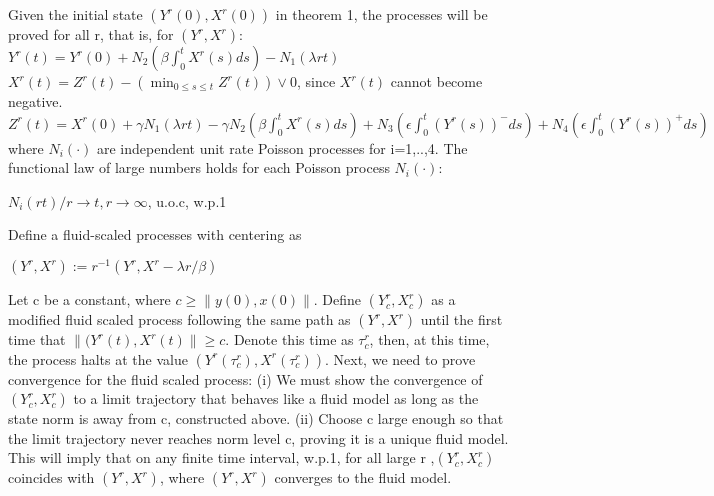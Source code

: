 Given the initial state $(Y^r(0), X^r (0))$ in theorem 1, the processes will be proved for all r, that is, for $(Y^r , X^r)$:
\newline
\newline$Y^r(t)=Y^r(0) +N_2 (\beta \int_0^tX^r(s)ds)-N_1(\lambda rt) $
\newline
\newline $X^r(t)= Z^r(t) - (\min_{0\leq s\leq t} Z^r(t)) \vee 0$, since $X^r(t)$ cannot become negative.
\newline
\newline $Z^r(t)=X^r(0) + \gamma N_1(\lambda rt) - \gamma N_2(\beta \int_0^tX^r(s)ds) +N_3(\epsilon \int_0^t(Y^r(s))^-ds) + N_4(\epsilon \int_0^t(Y^r(s))^+ds)$
\newline
\newline where $N_i(\cdot)$ are independent unit rate Poisson processes for i=1,..,4.
\newline
\newline The functional law of large numbers holds for each Poisson process $N_i(\cdot)$:
\newline
\begin{center}$ N_i(rt)/r \rightarrow t,r \rightarrow \infty$, u.o.c, w.p.1
\end{center}
\newpage 
Define a fluid-scaled processes with centering as
\begin{center}
$(Y^r , X^r):= r^{-1} (Y^r, X^r - \lambda r/\beta)$
\end{center}
\newline
\newline
Let c be a constant, where $ c \geq \| y(0), x(0) \|$. Define $(Y_c^r,X_c^r)$ as a modified fluid scaled process following the same path as $(Y^r,X^r)$ until the first time that $\|(Y^r(t),X^r(t)\| \geq c$. Denote this time as $\tau_c^r$, then, at this time, the process halts at the value $(Y^r(\tau_c^r),X^r(\tau_c^r))$. 
\newline
\newline Next, we need to prove convergence for the fluid scaled process:
\newline (i) We must show the convergence of $(Y_c^r,X_c^r)$ to a limit trajectory that behaves like a fluid model as long as the state norm is away from c, constructed above.
\newline (ii) Choose c large enough so that the limit trajectory never reaches norm level c, proving it is a unique fluid model. This will imply that on any finite time interval, w.p.1, for all large r ,$(Y_c^r, X_c^r)$ coincides with $(Y^ r , X^ r )$, where $(Y^ r , X^ r )$ converges to the fluid model.
